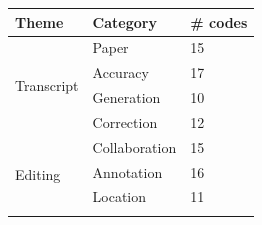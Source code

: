 \begin{table}[h]
\centering
{\small
\begin{tabular}{|l|l|l|} %
\hline
\textbf{Theme} & \textbf{Category} & \textbf{\# codes} \\ \hline
\multirow{4}{*}{Transcript}
& Paper & 15 \\ \cline{2-3}%
& Accuracy & 17 \\ \cline{2-3} %
& Generation & 10 \\ \cline{2-3} %
 & Correction & 12 \\ \hline %
\multirow{8}{*}{Editing}
& Collaboration & 15 \\ \cline{2-3} %
& Annotation & 16 \\ \cline{2-3} %
& Location & 11 \\ \cline{2-3} %

\end{tabular}}
\end{table}
